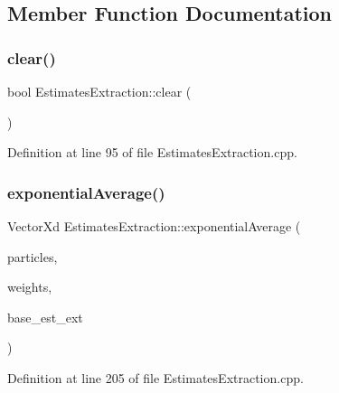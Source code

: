 \subsection{Member Function Documentation}
\mbox{\label{classbfl_1_1EstimatesExtraction_a26c432f43ff0849e54b2e9474c02d1a5}} 
\subsubsection{\texorpdfstring{clear()}{clear()}}
{\footnotesize\ttfamily bool Estimates\+Extraction\+::clear (\begin{DoxyParamCaption}{ }\end{DoxyParamCaption})}



Definition at line 95 of file Estimates\+Extraction.\+cpp.

\mbox{\label{classbfl_1_1EstimatesExtraction_afbba6972a0b2df1d60c67e364c7e1364}} 
\subsubsection{\texorpdfstring{exponential\+Average()}{exponentialAverage()}}
{\footnotesize\ttfamily Vector\+Xd Estimates\+Extraction\+::exponential\+Average (\begin{DoxyParamCaption}\item[{const Eigen\+::\+Ref$<$ const Eigen\+::\+Matrix\+Xd $>$ \&}]{particles,  }\item[{const Eigen\+::\+Ref$<$ const Eigen\+::\+Vector\+Xd $>$ \&}]{weights,  }\item[{const \mbox{\hyperlink{classbfl_1_1EstimatesExtraction_a8c0593a43166c569530947107c830462}{Statistics}} \&}]{base\+\_\+est\+\_\+ext }\end{DoxyParamCaption})\hspace{0.3cm}{\ttfamily [protected]}}



Definition at line 205 of file Estimates\+Extraction.\+cpp.

